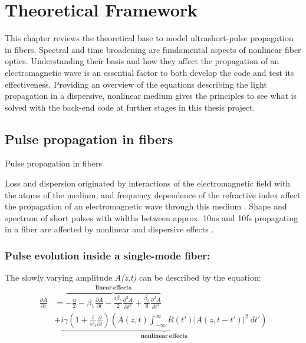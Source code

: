 \chapter{Theoretical Framework}

This chapter reviews the theoretical base to model ultrashort-pulse propagation in fibers. Spectral and time broadening are fundamental aspects of nonlinear fiber optics. Understanding their basis and how they affect the propagation of an electromagnetic wave is an essential factor to both develop the code and test its effectiveness. Providing an overview of the equations describing the light propagation in a dispersive, nonlinear medium gives the principles to see what is solved with the back-end code at further stages in this thesis project.




\section{Pulse propagation in fibers}

Pulse propagation in fibers

Loss and dispersion originated by interactions of the electromagnetic field with the atoms of the medium, and frequency dependence of the refractive index affect the propagation of an electromagnetic wave through this medium \citep{dudley_taylor_2010}. Shape and spectrum of short pulses with widths between approx. 10ns and 10fs propagating in a fiber are affected by nonlinear and dispersive effects \citep{AgrawalBook}.  

    \subsection{Pulse evolution inside a single-mode fiber:}
        The slowly varying amplitude \emph{A(z,t)} can be described by the equation:
        \begin{equation}\label{eq_a}
        \begin{split}
\frac{\partial A}{\partial z}&= \overbrace{-\frac{\alpha}{2} - \beta_1\frac{\partial A}{\partial t} - \frac{i \beta_2}{2} \frac{\partial^2 A}{\partial t^2} +\frac{\beta_3}{6} \frac{\partial^3 A}{\partial t^3}}^{\mathbf{linear \ effects}}\\  
            & +\underbrace{i \gamma \left( 1 + \frac{i}{\omega_0} \frac{\partial}{\partial t} \right) \left( A(z,t) \int_{-\infty}^{\infty} R(t') \left|A(z, t-t') \right|^2 \ dt'  \right)}_{\mathbf{nonlinear \ effects}}
        \end{split}
        \end{equation}

